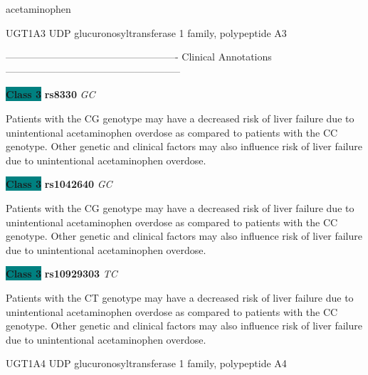 \documentclass{resume} %
\begin{document}
\begin{rSection}{ acetaminophen }
\begin{rSubsection}{ UGT1A3 }{ UDP glucuronosyltransferase 1 family, polypeptide A3 }{}{}
\item[] ---------------------------------------------------- Clinical Annotations -----------------------------------------------------\newline
\item \textbf{\colorbox{teal} {Class 3}} \textbf{ rs8330 } \textit{ GC }
\item[] Patients with the CG genotype may have a decreased risk of liver failure due to unintentional acetaminophen overdose as compared to patients with the CC genotype. Other genetic and clinical factors may also influence risk of liver failure due to unintentional acetaminophen overdose.\item \textbf{\colorbox{teal} {Class 3}} \textbf{ rs1042640 } \textit{ GC }
\item[] Patients with the CG genotype may have a decreased risk of liver failure due to unintentional acetaminophen overdose as compared to patients with the CC genotype. Other genetic and clinical factors may also influence risk of liver failure due to unintentional acetaminophen overdose.\item \textbf{\colorbox{teal} {Class 3}} \textbf{ rs10929303 } \textit{ TC }
\item[] Patients with the CT genotype may have a decreased risk of liver failure due to unintentional acetaminophen overdose as compared to patients with the CC genotype. Other genetic and clinical factors may also influence risk of liver failure due to unintentional acetaminophen overdose.
\end{rSubsection}\begin{rSubsection}{ UGT1A4 }{ UDP glucuronosyltransferase 1 family, polypeptide A4 }{}{}
\item[]


\end{rSubsection}
\end{rSection}
\end{document}
